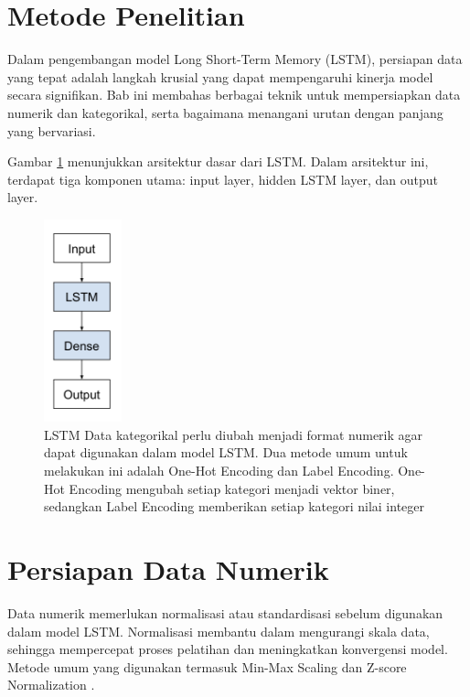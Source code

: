 \section{Metode Penelitian}
\par Dalam pengembangan model Long Short-Term Memory (LSTM), persiapan data yang tepat adalah langkah krusial yang dapat mempengaruhi kinerja model secara signifikan. Bab ini membahas berbagai teknik untuk mempersiapkan data numerik dan kategorikal, serta bagaimana menangani urutan dengan panjang yang bervariasi.
\par Gambar \ref{fig:lstm_architecture} menunjukkan arsitektur dasar dari LSTM. Dalam arsitektur ini, terdapat tiga komponen utama: input layer, hidden LSTM layer, dan output layer.

\begin{figure}[h]
    \centering
    \includegraphics[width=0.2\textwidth]{image/lstm1.png} 
    \caption{ LSTM Data kategorikal perlu diubah menjadi format numerik agar dapat digunakan dalam model LSTM. Dua metode umum untuk melakukan ini adalah One-Hot Encoding dan Label Encoding. One-Hot Encoding mengubah setiap kategori menjadi vektor biner, sedangkan Label Encoding memberikan setiap kategori nilai integer \citep{brownlee2017}}
    \label{fig:lstm_architecture}
\end{figure}
\section{Persiapan Data Numerik}
\par Data numerik memerlukan normalisasi atau standardisasi sebelum digunakan dalam model LSTM. Normalisasi membantu dalam mengurangi skala data, sehingga mempercepat proses pelatihan dan meningkatkan konvergensi model. Metode umum yang digunakan termasuk Min-Max Scaling dan Z-score Normalization \citep{brownlee2017}.

